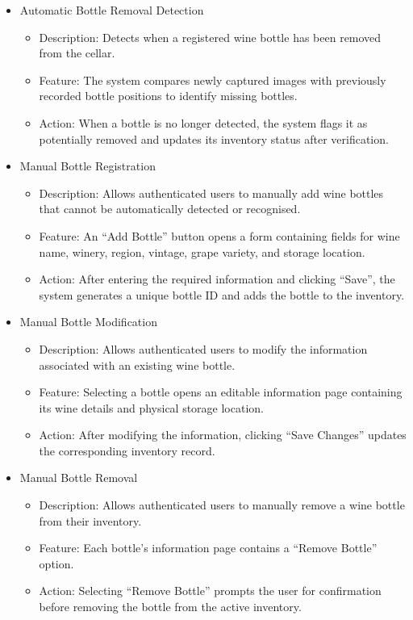\documentclass[conference]{IEEEtran}
\begin{document}
\begin{itemize}
    \item Automatic Bottle Removal Detection
    \begin{itemize}
        \item Description: Detects when a registered wine bottle has been removed from the cellar.
        \item Feature: The system compares newly captured images with previously recorded bottle positions to identify missing bottles.
        \item Action: When a bottle is no longer detected, the system flags it as potentially removed and updates its inventory status after verification.
    \end{itemize}

    \item Manual Bottle Registration
    \begin{itemize}
        \item Description: Allows authenticated users to manually add wine bottles that cannot be automatically detected or recognised.
        \item Feature: An ``Add Bottle'' button opens a form containing fields for wine name, winery, region, vintage, grape variety, and storage location.
        \item Action: After entering the required information and clicking ``Save'', the system generates a unique bottle ID and adds the bottle to the inventory.
    \end{itemize}

    \item Manual Bottle Modification
    \begin{itemize}
        \item Description: Allows authenticated users to modify the information associated with an existing wine bottle.
        \item Feature: Selecting a bottle opens an editable information page containing its wine details and physical storage location.
        \item Action: After modifying the information, clicking ``Save Changes'' updates the corresponding inventory record.
    \end{itemize}

    \item Manual Bottle Removal
    \begin{itemize}
        \item Description: Allows authenticated users to manually remove a wine bottle from their inventory.
        \item Feature: Each bottle's information page contains a ``Remove Bottle'' option.
        \item Action: Selecting ``Remove Bottle'' prompts the user for confirmation before removing the bottle from the active inventory.
    \end{itemize}
\end{itemize}
\end{document}
